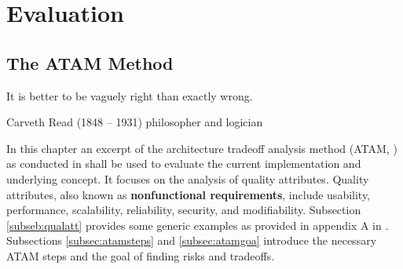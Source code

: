 \chapter{Evaluation\label{cha:chapter6}}



\section{The ATAM Method}
\epigraph{It is better to be vaguely right than exactly wrong.}{Carveth Read (1848 – 1931) philosopher and logician}
In this chapter an excerpt of the architecture tradeoff analysis method (ATAM, \cite{Kazman2000ATAMEvaluation}) as conducted in \cite{Bianco2007EvaluatingArchitecture} shall be used to evaluate the current implementation and underlying concept. It focuses on the analysis of quality attributes. Quality attributes, also known as \textbf{nonfunctional requirements}, include usability, performance, scalability, reliability, security, and modifiability. Subsection \ref{subseb:qualatt} provides some generic examples as provided in appendix A in \cite{Bianco2007EvaluatingArchitecture}. Subsections \ref{subsec:atamsteps} and \ref{subsec:atamgoa} introduce the necessary ATAM steps and the goal of finding risks and tradeoffs. 

